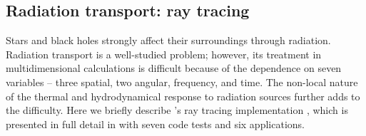 \subsection{Radiation transport: ray tracing}
\label{sec.num.raytracing}

Stars and black holes strongly affect their surroundings through radiation.
Radiation transport is a well-studied problem; however, its treatment in
multidimensional calculations is difficult because of the dependence on seven
variables -- three spatial, two angular, frequency, and time.  The non-local
nature of the thermal and hydrodynamical response to radiation sources further
adds to the difficulty.  Here we briefly describe \enzo's ray tracing
implementation \moray, which is presented in full detail in
\citet{Wise11_Moray} with seven code tests and six applications.


